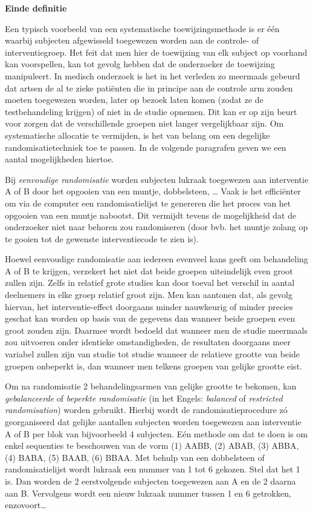 \documentclass[
  12pt,dutch]{book}
\theoremstyle{definition}
\theoremstyle{definition}
\theoremstyle{definition}
\theoremstyle{definition}
\theoremstyle{remark}
\begin{document}
\textbf{Einde definitie}

Een typisch voorbeeld van een systematische toewijzingsmethode is er één
waarbij subjecten afgewisseld toegewezen worden aan de controle- of
interventiegroep. Het feit dat men hier de toewijzing van elk subject op voorhand kan
voorspellen, kan tot gevolg hebben dat de onderzoeker de toewijzing
manipuleert. In medisch onderzoek is het in het verleden zo meermaals gebeurd dat artsen de al te zieke patiënten die in principe aan de
controle arm zouden moeten toegewezen worden, later op bezoek laten komen
(zodat ze de testbehandeling krijgen) of niet in de studie opnemen. Dit
kan er op zijn beurt voor zorgen dat de verschillende groepen niet langer
vergelijkbaar zijn. Om systematische allocatie te vermijden, is het van
belang om een degelijke randomisatietechniek toe te passen. In de volgende
paragrafen geven we een aantal mogelijkheden hiertoe.

Bij \emph{eenvoudige randomisatie} worden subjecten lukraak toegewezen
aan interventie A of B door het opgooien van een muntje, dobbelsteen, \ldots{}
Vaak is het efficiënter om via de computer een randomisatielijst te
genereren die het proces van het opgooien van een muntje nabootst. Dit
vermijdt tevens de mogelijkheid dat de onderzoeker niet naar behoren zou
randomiseren (door bvb. het muntje zolang op te gooien tot de gewenste
interventiecode te zien is).

Hoewel eenvoudige randomisatie aan iedereen evenveel kans geeft om
behandeling A of B te krijgen, verzekert het niet dat beide groepen
uiteindelijk even groot zullen zijn. Zelfs in relatief grote studies kan
door toeval het verschil in aantal deelnemers in elke groep relatief groot
zijn. Men kan aantonen dat, als gevolg hiervan, het interventie-effect
doorgaans minder nauwkeurig of minder precies geschat kan worden op basis
van de gegevens dan wanneer beide groepen even groot zouden zijn. Daarmee
wordt bedoeld dat wanneer men de studie meermaals zou uitvoeren onder
identieke omstandigheden, de resultaten doorgaans meer variabel zullen zijn
van studie tot studie wanneer de relatieve grootte van beide groepen onbeperkt
is, dan wanneer men telkens groepen van gelijke grootte eist.

Om na randomisatie 2 behandelingsarmen van gelijke grootte te bekomen, kan
\emph{gebalanceerde} of \emph{beperkte randomisatie} (in het Engels:
\emph{balanced} of \emph{restricted randomisation}) worden gebruikt.
Hierbij wordt de randomisatieprocedure zó georganiseerd dat gelijke
aantallen subjecten worden toegewezen aan interventie A of B per blok van
bijvoorbeeld 4 subjecten. Eén methode om dat te doen is om enkel
sequenties te beschouwen van de vorm (1) AABB, (2) ABAB, (3) ABBA, (4) BABA,
(5) BAAB, (6) BBAA. Met behulp van een dobbelsteen of randomisatielijst
wordt lukraak een nummer van 1 tot 6 gekozen. Stel dat het 1 is. Dan worden
de 2 eerstvolgende subjecten toegewezen aan A en de 2 daarna aan B.
Vervolgens wordt een nieuw lukraak nummer tussen 1 en 6 getrokken,
enzovoort\ldots{}
\end{document}
